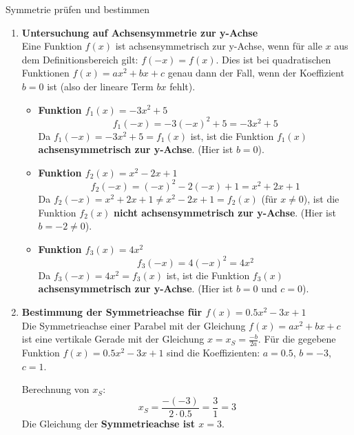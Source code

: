 \begin{loesungsumgebung}{Symmetrie prüfen und bestimmen}

\begin{enumerate}[label=(\alph*)]
    \item \textbf{Untersuchung auf Achsensymmetrie zur y-Achse} \\
    Eine Funktion $f(x)$ ist achsensymmetrisch zur y-Achse, wenn für alle $x$ aus dem Definitionsbereich gilt: $f(-x) = f(x)$. Dies ist bei quadratischen Funktionen $f(x)=ax^2+bx+c$ genau dann der Fall, wenn der Koeffizient $b=0$ ist (also der lineare Term $bx$ fehlt).

    \begin{itemize}
        \item \textbf{Funktion $f_1(x) = -3x^2 + 5$}
        $$ f_1(-x) = -3(-x)^2 + 5 = -3x^2 + 5 $$
        Da $f_1(-x) = -3x^2 + 5 = f_1(x)$ ist, ist die Funktion $f_1(x)$ \textbf{achsensymmetrisch zur y-Achse}. (Hier ist $b=0$).

        \item \textbf{Funktion $f_2(x) = x^2 - 2x + 1$}
        $$ f_2(-x) = (-x)^2 - 2(-x) + 1 = x^2 + 2x + 1 $$
        Da $f_2(-x) = x^2 + 2x + 1 \neq x^2 - 2x + 1 = f_2(x)$ (für $x \neq 0$), ist die Funktion $f_2(x)$ \textbf{nicht achsensymmetrisch zur y-Achse}. (Hier ist $b=-2 \neq 0$).

        \item \textbf{Funktion $f_3(x) = 4x^2$}
        $$ f_3(-x) = 4(-x)^2 = 4x^2 $$
        Da $f_3(-x) = 4x^2 = f_3(x)$ ist, ist die Funktion $f_3(x)$ \textbf{achsensymmetrisch zur y-Achse}. (Hier ist $b=0$ und $c=0$).
    \end{itemize}

    \item \textbf{Bestimmung der Symmetrieachse für $f(x) = 0.5x^2 - 3x + 1$} \\
    Die Symmetrieachse einer Parabel mit der Gleichung $f(x) = ax^2+bx+c$ ist eine vertikale Gerade mit der Gleichung $x = x_S = \frac{-b}{2a}$.
    Für die gegebene Funktion $f(x) = 0.5x^2 - 3x + 1$ sind die Koeffizienten:
    $a = 0.5$, $b = -3$, $c = 1$.

    Berechnung von $x_S$:
    $$ x_S = \frac{-(-3)}{2 \cdot 0.5} = \frac{3}{1} = 3 $$
    Die Gleichung der \textbf{Symmetrieachse ist $x = 3$}.


\end{enumerate}
\end{loesungsumgebung}
